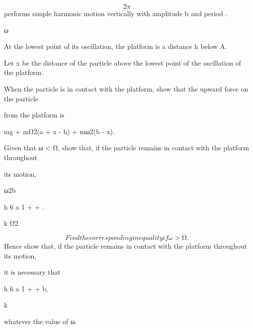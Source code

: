 \documentclass[12pt]{article}
\begin{document}
\begin{flushleft}
\[2\pi\]
performs simple harmonic motion vertically with amplitude b and period .\par
ω\par
At the lowest point of its oscillation, the platform is a distance h below A.\par
Let x be the distance of the particle above the lowest point of the oscillation of the platform.\par
When the particle is in contact with the platform, show that the upward force on the particle\par
from the platform is\par
mg + mΩ2(a + x - h) + mω2(b - x).\par
Given that ω < Ω, show that, if the particle remains in contact with the platform throughout\par
its motion,\par
{} \mu ω2b\par
h 6 a 1 + + .\par
k Ω2\par
\[Find the corresponding inequality if ω > Ω.\]
Hence show that, if the particle remains in contact with the platform throughout its motion,\par
it is necessary that\par
\lambda \mu\par
h 6 a 1 + + b,\par
k\par
whatever the value of ω.\par
\end{flushleft}
\end{document}
